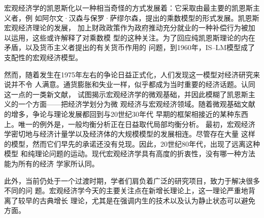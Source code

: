 宏观经济学的凯恩斯化以一种相当奇怪的方式发展着：它采取由最主要的凯恩斯主义者，例
如阿尔文·汉森与保罗·萨缪尔森，提出的乘数模型的形式发展。凯恩斯宏观经济理论的发展，
加上财政政策作为政府推动充分就业的一种补偿行为被加以运用，这些或许解释了对乘数模
型的这种关注。为了回应纯凯恩斯理论的内在矛盾，以及货币主义者提出的有关货币作用的
问题，到1960年，IS--LM模型成了支配性的宏观经济模型。

然而，随着发生在1975年左右的争论日益正式化，人们发现这一模型对经济研究来说并不令
人满意。通货膨胀和失业一样，似乎都成为当时重要的经济话题。认同这一点的一类新文献，
试图揭示宏观经济学的微观基础，并因此模糊了凯恩斯主义的一个方面——把经济学划分为微
观经济与宏观经济领域。随着微观基础文献的增多，争论与理论发展都回到与20世纪30年代
早期的框架相接近的某种东西上。唯一的例外是，一般均衡分析正在日益取代局部均衡分析。
最初，宏观经济学密切地与经济计量学以及经济体的大规模模型的发展相连。尽管存在大量
这样的模型，然而它们早先的承诺还没有兑现。因此，20世纪80年代，出现了远离这种模型
和纯理论问题的运动。现代宏观经济学具有高度的折衷性，没有哪一种方法能为所有的经济
学家所认同。

此外，当前仍处于一个过渡时期，学者们肩负着广泛的研究项目，致力于解决很多不同的问
题。宏观经济学今天的主要关注点在新增长理论上，这一理论严重地背离了较早的古典增长
理论，尤其是在强调内生的技术以及认为静止状态可以避免方面。


